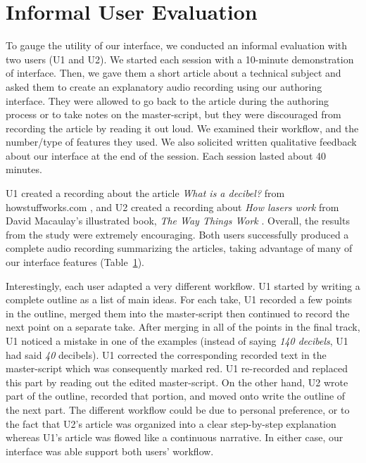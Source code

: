 \section{Informal User Evaluation}

To gauge the utility of our interface, we conducted an informal evaluation with two users (U1 and U2). We started each session with a 10-minute demonstration of interface. Then, we gave them a short article about a technical subject and asked them to create an explanatory audio recording using our authoring interface. They were allowed to go back to the article during the authoring process or to take notes on the master-script, but they were discouraged from recording the article by reading it out loud. We examined their workflow, and the number/type of features they used. We also solicited written qualitative feedback about our interface at the end of the session. Each session lasted about 40 minutes.

U1 created a recording about the article \textit{What is a decibel? } from howstuffworks.com \cite{}, and U2 created a recording about \textit{How lasers work} from David Macaulay's illustrated book, \textit{The Way Things Work} \cite{}. Overall, the results from the study were extremely encouraging. Both users successfully produced a complete audio recording summarizing the articles, taking advantage of many of our interface features (Table~\ref{}). 

Interestingly, each user adapted a very different workflow. U1 started by writing a complete outline as a list of main ideas. For each take, U1 recorded a few points in the outline, merged them into the master-script then continued to record the next point on a separate take. After merging in all of the points in the final track, U1 noticed a mistake in one of the examples (instead of saying \textit{140 decibels}, U1 had said \textit{40} decibels). U1 corrected the corresponding recorded text in the master-script which was consequently marked red. U1 re-recorded and replaced this part by reading out the edited master-script. On the other hand, U2 wrote part of the outline, recorded that portion, and moved onto write the outline of the next part. The different workflow could be due to personal preference, or  to the fact that U2's article was organized into a clear step-by-step explanation whereas U1's article was flowed like a continuous narrative. In either case, our interface was able support both users' workflow. 

